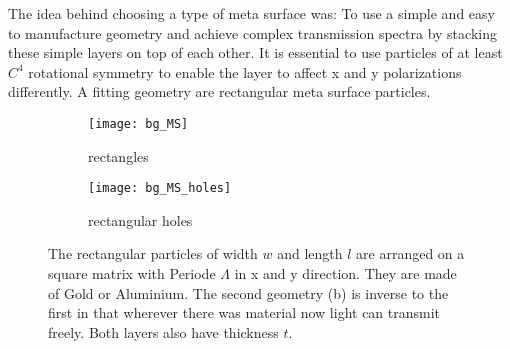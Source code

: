 


The idea behind choosing a type of meta surface was: To use a simple and easy to manufacture geometry and achieve complex transmission spectra by stacking these simple layers on top of each other. It is essential to use particles of at least $C^4$ rotational symmetry to enable the layer to affect x and y polarizations differently. A fitting geometry are rectangular meta surface particles.

\begin{figure}[H]
\centering
\begin{subfigure}{.5\textwidth}
    \centering
    \texttt{[image: bg\_MS]}
    \caption{rectangles}
    \label{}
\end{subfigure}%
\begin{subfigure}{.5\textwidth}
    \centering
    \texttt{[image: bg\_MS\_holes]}
    \caption{rectangular holes}
    \label{}
\end{subfigure}
\caption{The rectangular particles of width $w$ and length $l$ are arranged on a square matrix with Periode $\Lambda$ in x and y direction. They are made of Gold or Aluminium. The second geometry (b) is inverse to the first in that wherever there was material now light can transmit freely. Both layers also have thickness $t$.}
\label{fig:bg:MS}
\end{figure}
